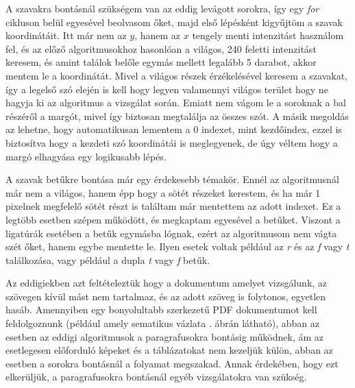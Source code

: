 A szavakra bontásnál szükségem van az eddig levágott sorokra, így egy \textit{for} cikluson belül egyesével beolvasom őket, majd első lépésként kigyűjtöm a szavak koordinátáit. Itt már nem az $y$, hanem az $x$ tengely menti intenzitást használom fel, és az előző algoritmusokhoz hasonlóan a világos, 240 feletti intenzitást keresem, és amint találok belőle egymás mellett legalább 5 darabot, akkor mentem le a koordinátát. Mivel a világos részek érzékelésével keresem a szavakat, így a legelső szó elején is kell hogy legyen valamennyi világos terület hogy ne hagyja ki az algoritmus a vizsgálat során. Emiatt nem vágom le a soroknak a bal részéről a margót, mivel így biztosan megtalálja az összes szót. A másik megoldás az lehetne, hogy automatikusan lementem a 0 indexet, mint kezdőindex, ezzel is biztosítva hogy a kezdeti szó koordinátái is meglegyenek, de úgy véltem hogy a margó elhagyása egy logikusabb lépés.


A szavak betűkre bontása már egy érdekesebb témakör. Ennél az algoritmusnál már nem a világos, hanem épp hogy a sötét részeket kerestem, és ha már 1 pixelnek megfelelő sötét részt is találtam már mentettem az adott indexet. Ez a legtöbb esetben szépen működött, és megkaptam egyesével a betűket. Viszont a ligatúrák esetében a betűk egymásba lógnak, ezért az algoritmusom nem vágta szét őket, hanem egybe mentette le. Ilyen esetek voltak például az \emph{r} és az \emph{f} vagy \emph{t} találkozása, vagy például a dupla \emph{t} vagy \emph{f} betűk.


Az eddigiekben azt feltételeztük hogy a dokumentum amelyet vizsgálunk, az szövegen kívül mást nem tartalmaz, és az adott szöveg is folytonos, egyetlen hasáb. Amennyiben egy bonyolultabb szerkezetű PDF dokumentumot kell feldolgoznunk (például amely sematikus vázlata . ábrán látható), abban az esetben az eddigi algoritmusok a paragrafusokra bontásig működnek, ám az esetlegesen előforduló képeket és a táblázatokat nem kezeljük külön, abban az esetben a sorokra bontásnál a folyamat megszakad. Annak érdekében, hogy ezt elkerüljük, a paragrafusokra bontásnál egyéb vizsgálatokra van szükség.

